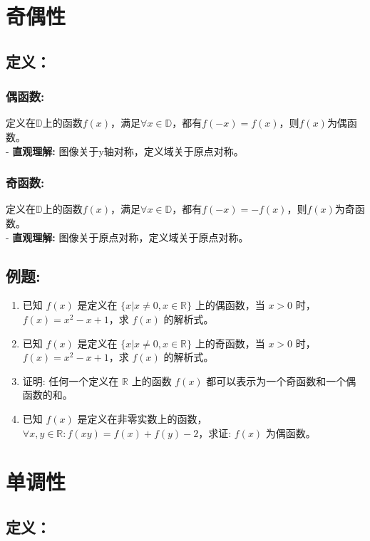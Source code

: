 \documentclass{ctexart}
\begin{document}
\newpage
\section*{奇偶性}
\subsection*{定义：}
\subsubsection*{\textbf{偶函数:}}
定义在$\mathbb{D}$上的函数$f(x)$，满足$\forall x \in \mathbb{D}$，都有$f(-x) = f(x)$，则$f(x)$为偶函数。\\
- \textbf{直观理解:} 图像关于y轴对称，定义域关于原点对称。

\subsubsection*{\textbf{奇函数:}}
定义在$\mathbb{D}$上的函数$f(x)$，满足$\forall x \in \mathbb{D}$，都有$f(-x) = -f(x)$，则$f(x)$为奇函数。\\
- \textbf{直观理解:} 图像关于原点对称，定义域关于原点对称。

\subsection*{例题:}
\begin{enumerate}
  \item 已知 $f(x)$ 是定义在 $\{x | x \neq 0, x \in \mathbb{R}\}$ 上的偶函数，当 $x > 0$ 时，$f(x) = x^2 - x + 1$，求 $f(x)$ 的解析式。
  \vspace{20mm}
  \item 已知 $f(x)$ 是定义在 $\{x | x \neq 0, x \in \mathbb{R}\}$ 上的奇函数，当 $x > 0$ 时，$f(x) = x^2 - x + 1$，求 $f(x)$ 的解析式。
  \vspace{20mm}
  \item 证明: 任何一个定义在 $\mathbb{R}$ 上的函数 $f(x)$ 都可以表示为一个奇函数和一个偶函数的和。
  \vspace{40mm}
  \item 已知 $f(x)$ 是定义在非零实数上的函数，$\forall x,y \in \mathbb{R}: f(xy) = f(x) + f(y) - 2$，求证: $f(x)$ 为偶函数。
\end{enumerate}

\newpage
\section*{单调性}
\subsection*{定义：}
\end{document}
